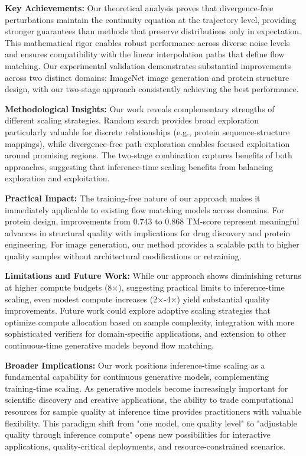 \documentclass{article}
\begin{document}
\textbf{Key Achievements:} Our theoretical analysis proves that divergence-free perturbations maintain the continuity equation at the trajectory level, providing stronger guarantees than methods that preserve distributions only in expectation. This mathematical rigor enables robust performance across diverse noise levels and ensures compatibility with the linear interpolation paths that define flow matching. Our experimental validation demonstrates substantial improvements across two distinct domains: ImageNet image generation and protein structure design, with our two-stage approach consistently achieving the best performance.

\textbf{Methodological Insights:} Our work reveals complementary strengths of different scaling strategies. Random search provides broad exploration particularly valuable for discrete relationships (e.g., protein sequence-structure mappings), while divergence-free path exploration enables focused exploitation around promising regions. The two-stage combination captures benefits of both approaches, suggesting that inference-time scaling benefits from balancing exploration and exploitation.

\textbf{Practical Impact:} The training-free nature of our approach makes it immediately applicable to existing flow matching models across domains. For protein design, improvements from 0.743 to 0.868 TM-score represent meaningful advances in structural quality with implications for drug discovery and protein engineering. For image generation, our method provides a scalable path to higher quality samples without architectural modifications or retraining.

\textbf{Limitations and Future Work:} While our approach shows diminishing returns at higher compute budgets (8×), suggesting practical limits to inference-time scaling, even modest compute increases (2×-4×) yield substantial quality improvements. Future work could explore adaptive scaling strategies that optimize compute allocation based on sample complexity, integration with more sophisticated verifiers for domain-specific applications, and extension to other continuous-time generative models beyond flow matching.

\textbf{Broader Implications:} Our work positions inference-time scaling as a fundamental capability for continuous generative models, complementing training-time scaling. As generative models become increasingly important for scientific discovery and creative applications, the ability to trade computational resources for sample quality at inference time provides practitioners with valuable flexibility. This paradigm shift from "one model, one quality level" to "adjustable quality through inference compute" opens new possibilities for interactive applications, quality-critical deployments, and resource-constrained scenarios.
\end{document}
